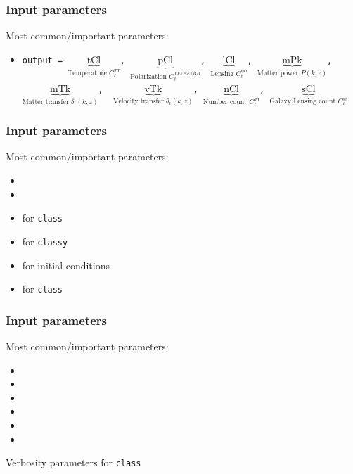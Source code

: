 \begin{frame}[fragile]
	\frametitle{Input parameters}
	Most common/important parameters:
	\begin{itemize}
		\item \texttt{output = {\Red $\underbrace{\text{tCl}}_\text{Temperature $C_\ell^{TT}$}$, $\underbrace{\text{pCl}}_\text{Polarization $C_\ell^{TE/EE/BB}$}$, $\underbrace{\text{lCl}}_\text{Lensing $C_\ell^{\phi \phi}$}$}, {\Purple $\underbrace{\text{mPk}}_\text{Matter power $P(k,z)$}$, $\underbrace{\text{mTk}}_\text{Matter transfer $\delta_i(k,z)$}$, }
		$\underbrace{\text{vTk}}_\text{Velocity transfer $\theta_i(k,z)$}$,
		$\underbrace{\text{nCl}}_\text{Number count $C_\ell^{dd}$}$, 
		$\underbrace{\text{sCl}}_\text{Galaxy Lensing count $C_\ell^{ss}$}$ }
	\end{itemize}
\end{frame}

\begin{frame}[fragile]
	\frametitle{Input parameters}
	Most common/important parameters:
	\begin{itemize}
		\item {}
		\item {}
		\item {}  for {\Red \tt class}
		\item {}  for {\Purple \tt classy}
		\item {} for initial conditions
		\item {} for {\Red \tt class}
	\end{itemize}
\end{frame}


\begin{frame}[fragile]
	\frametitle{Input parameters}
	Most common/important parameters:
	\begin{itemize}
		\item {}
		\item {}
		\item {}
		\item {}
		\item {}
		\item {}
	\end{itemize}
	Verbosity parameters for {\Red \tt class}
\end{frame}


